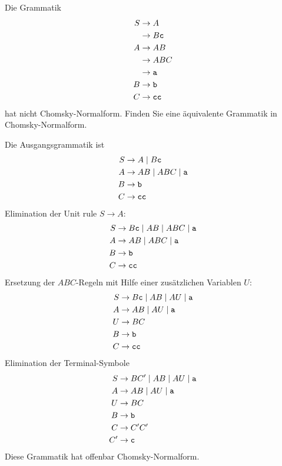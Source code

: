Die Grammatik
\begin{align*}
S&\to A\\
 &\to B{\tt c}\\
A&\to AB\\
 &\to ABC\\
 &\to {\tt a}\\
B&\to {\tt b}\\
C&\to {\tt cc}
\end{align*}
hat nicht Chomsky-Normalform. Finden Sie eine äquivalente Grammatik
in Chomsky-Normalform.

\begin{loesung}
Die Ausgangsgrammatik ist
\begin{align*}
S&\to A\;|\;B{\tt c}\\
A&\to AB\;|\;ABC\;|\;{\tt a}\\
B&\to {\tt b}\\
C&\to {\tt cc}
\end{align*}
Elimination der Unit rule $S\to A$:
\begin{align*}
S&\to B{\tt c}\;|\;AB\;|\;ABC\;|\;{\tt a}\\
A&\to AB\;|\;ABC\;|\;{\tt a}\\
B&\to {\tt b}\\
C&\to {\tt cc}
\end{align*}
Ersetzung der $ABC$-Regeln mit Hilfe einer zusätzlichen
Variablen $U$:
\begin{align*}
S&\to B{\tt c}\;|\;AB\;|\;AU\;|\;{\tt a}\\
A&\to AB\;|\;AU\;|\;{\tt a}\\
U&\to BC\\
B&\to {\tt b}\\
C&\to {\tt cc}
\end{align*}
Elimination der Terminal-Symbole
\begin{align*}
S&\to BC'\;|\;AB\;|\;AU\;|\;{\tt a}\\
A&\to AB\;|\;AU\;|\;{\tt a}\\
U&\to BC\\
B&\to {\tt b}\\
C&\to C'C'\\
C'&\to {\tt c}\\
\end{align*}
Diese Grammatik hat offenbar Chomsky-Normalform.
\end{loesung}
